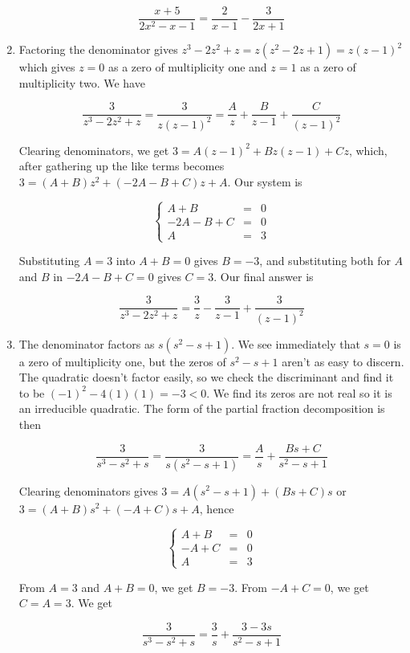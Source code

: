\documentclass{ximera}
\begin{document}
\begin{example}
\begin{enumerate}
\[\dfrac{x+5}{2x^2-x-1} = \dfrac{2}{x-1} -\dfrac{3}{2x+1} \]

\item  Factoring the denominator gives $z^3-2z^2+z = z\left(z^2-2z+1\right) = z(z-1)^2$ which gives $z=0$ as a zero of multiplicity one and $z=1$ as a zero of multiplicity two. We have

\[ \dfrac{3}{z^3-2z^2+z} = \dfrac{3}{z(z-1)^2} = \dfrac{A}{z} + \dfrac{B}{z-1} + \dfrac{C}{(z-1)^2} \]

Clearing denominators, we get $3 = A(z-1)^2 + Bz(z-1)+Cz$, which, after gathering up the like terms becomes $3 = (A+B)z^2+(-2A-B+C)z + A$.  Our system is 
 
\[ \left\{ \begin{array}{rcr}  A+B & = & 0 \\ -2A-B+C & = & 0 \\ A & = & 3 \end{array} \right.\]

Substituting $A=3$ into $A+B = 0$ gives $B = -3$, and substituting both for $A$ and $B$ in $-2A-B+C = 0$ gives $C = 3$.  Our final answer is

\[ \dfrac{3}{z^3-2z^2+z} = \dfrac{3}{z} - \dfrac{3}{z-1} + \dfrac{3}{(z-1)^2} \]

\item  The denominator factors as $s\left(s^2-s+1\right)$.  We see immediately that $s=0$ is a zero of multiplicity one, but the zeros of $s^2-s+1$ aren't as easy to discern.  The quadratic doesn't factor easily, so we check the discriminant and find it to be $(-1)^2-4(1)(1) = -3 < 0$.  We find its zeros are not real so it is an irreducible quadratic.  The form of the partial fraction decomposition is then

\[\dfrac{3}{s^3-s^2+s} = \dfrac{3}{s\left(s^2-s+1\right)} = \dfrac{A}{s} + \dfrac{Bs+C}{s^2-s+1}\]

Clearing denominators gives $3 = A\left(s^2-s+1\right) + (Bs+C)s$ or $3 = (A+B)s^2 + (-A+C)s +A$, hence

\[ \left\{ \begin{array}{rcr}  A+B & = & 0 \\ -A+C & = & 0 \\ A & = & 3 \end{array} \right.\]

From $A=3$ and $A+B = 0$, we get $B = -3$.  From $-A+C = 0$, we get $C = A = 3$.  We get


\[\dfrac{3}{s^3-s^2+s} =  \dfrac{3}{s} + \dfrac{3-3s}{s^2-s+1}\]


\end{enumerate}
\end{example}
\end{document}
